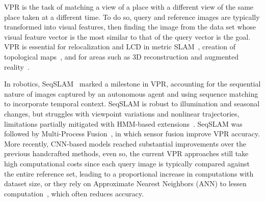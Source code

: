 \documentclass[letterpaper, 10 pt, conference]{ieeeconf}  %
\begin{document}
\ac{VPR} is the task of matching a view of a place with a different view of the same place taken at a different time. To do so, query and reference images are typically transformed into visual features, then finding the image from the data set whose visual feature vector is the most similar to that of the query vector is the goal.
\ac{VPR} is essential for relocalization and \ac{LCD} in metric \ac{SLAM}~\cite{orbslam},  creation of topological maps~\cite{fabmap}, and for areas such as 3D reconstruction and augmented reality~\cite{whereisvpr}.

%

%
In robotics, \ac{SeqSLAM}~\cite{seqslam} marked a milestone in \ac{VPR}, accounting for the sequential nature of images captured by an autonomous agent and using sequence matching to incorporate temporal context. \ac{SeqSLAM} is robust to illumination and seasonal changes, but struggles with viewpoint variations and nonlinear trajectories, limitations partially mitigated with \ac{HMM}-based extensions~\cite{hmmseqslam}. \ac{SeqSLAM} was followed by Multi-Process Fusion~\cite{mpf}, in which sensor fusion improve \ac{VPR} accuracy. More recently, CNN-based models reached substantial improvements over the previous handcrafted methods, even so, the current \ac{VPR} approaches still take high computational costs since each query image is typically compared against the entire reference set, leading to a proportional increase in computations with dataset size, or they rely on Approximate Nearest Neighbors (ANN) to lessen computation~\cite{pair_vpr, transfvpr}, which often reduces accuracy.
\end{document}
